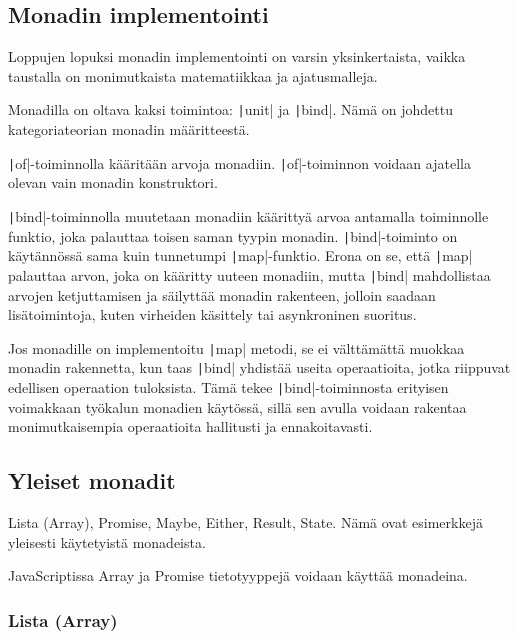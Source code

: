 \subsection{Monadin implementointi}

Loppujen lopuksi monadin implementointi on varsin yksinkertaista, vaikka taustalla on monimutkaista matematiikkaa ja ajatusmalleja.

Monadilla on oltava kaksi toimintoa: \texttt|unit| ja \texttt|bind|. Nämä on johdettu kategoriateorian monadin määritteestä. \citep{bartosz_category_for_progamers_10}

\texttt|of|-toiminnolla kääritään arvoja monadiin. \texttt|of|-toiminnon voidaan ajatella olevan vain monadin konstruktori.

\texttt|bind|-toiminnolla muutetaan monadiin käärittyä arvoa antamalla toiminnolle funktio, joka palauttaa toisen saman tyypin monadin. \texttt|bind|-toiminto on käytännössä sama kuin tunnetumpi \texttt|map|-funktio. Erona on se, että \texttt|map| palauttaa arvon, joka on kääritty uuteen monadiin, mutta \texttt|bind| mahdollistaa arvojen ketjuttamisen ja säilyttää monadin rakenteen, jolloin saadaan lisätoimintoja, kuten virheiden käsittely tai asynkroninen suoritus.

Jos monadille on implementoitu \texttt|map| metodi, se ei välttämättä muokkaa monadin rakennetta, kun taas \texttt|bind| yhdistää useita operaatioita, jotka riippuvat edellisen operaation tuloksista. Tämä tekee \texttt|bind|-toiminnosta erityisen voimakkaan työkalun monadien käytössä, sillä sen avulla voidaan rakentaa monimutkaisempia operaatioita hallitusti ja ennakoitavasti.



\subsection{Yleiset monadit}

Lista (Array), Promise, Maybe, Either, Result, State. Nämä ovat esimerkkejä yleisesti käytetyistä monadeista.

JavaScriptissa Array ja Promise tietotyyppejä voidaan käyttää monadeina.


\subsubsection{Lista (Array)}


